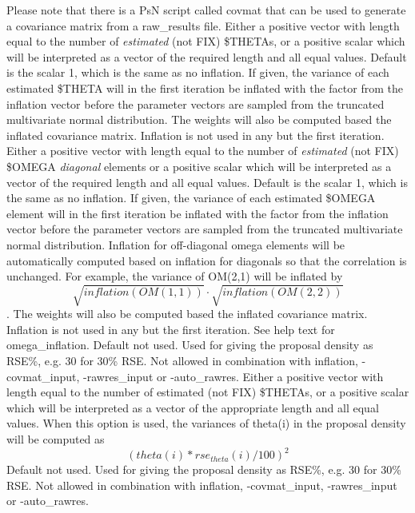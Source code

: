 \begin{optionlist}
Please note that there is a PsN script called covmat that can be used to generate a covariance matrix from a raw\_results file.
\nextopt
{}
Either a positive vector with length equal to the number of \emph{estimated} (not FIX) \$THETAs, or
a positive scalar which will be interpreted as a vector of the required length and all equal values.
Default is the scalar 1, which is the same as no inflation. 
If given, the variance
of each estimated \$THETA 
will in the first iteration be inflated with the factor from the inflation vector
before the parameter vectors
are sampled from the truncated multivariate normal distribution.
The weights will also be computed based the inflated covariance matrix. 
Inflation is not used in any but the first iteration.
\nextopt
{}
Either a positive vector with length equal to the number of \emph{estimated} (not FIX) 
\$OMEGA \emph{diagonal} elements
or
a positive scalar which will be interpreted as a vector of the required length and all equal values.
Default is the scalar 1, which is the same as no inflation. 
If given, the variance
of each estimated \$OMEGA element
will in the first iteration be inflated with the factor from the inflation vector
before the parameter vectors
are sampled from the truncated multivariate normal distribution. Inflation for off-diagonal
omega elements will be automatically computed based on inflation for diagonals so that the correlation is unchanged.
For example, the variance of OM(2,1) will be inflated by 
\[
\sqrt{inflation(OM(1,1))}\cdot\sqrt{inflation(OM(2,2))}
\].
The weights will also be computed based the inflated covariance matrix. 
Inflation is not used in any but the first iteration.
\nextopt
{}
See help text for omega\_inflation.
\nextopt
{}
Default not used. Used for giving the proposal density as RSE\%, e.g. 30 for 30\% RSE.
Not allowed in combination with inflation, -covmat\_input, -rawres\_input or -auto\_rawres.
Either a positive vector with length equal to the number of estimated (not FIX) \$THETAs, or
a positive scalar which will be interpreted as a vector of the appropriate length and all equal values.
When this option is used, the variances of theta(i) in the proposal density will be computed
as 
\[
\left(theta(i)*rse_{theta}(i)/100\right)^2
\]
\nextopt
{}
Default not used. Used for giving the proposal density as RSE\%, e.g. 30 for 30\% RSE.
Not allowed in combination with inflation, -covmat\_input, -rawres\_input or -auto\_rawres.

\end{optionlist}
